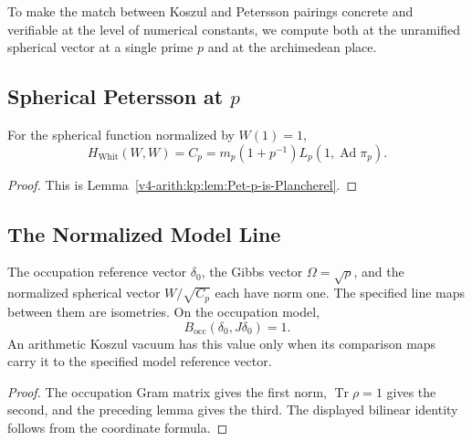 To make the match between Koszul and Petersson pairings
concrete and verifiable at the level of numerical constants,
we compute both at the unramified spherical vector at a
single prime \(p\) and at the archimedean place.

\subsection{Spherical Petersson at \texorpdfstring{\(p\)}{p}}
\label{v4-arith:kp:spherical-calc:Pet-p}

\begin{lemma}
\label{v4-arith:kp:lem:spherical-Pet-p}
For the spherical function normalized by \(W(1)=1\),
\begin{equation}
\label{v4-arith:kp:eq:spherical-Pet-p}
 H_{\mathrm{Whit}}(W,W)=C_p
 =m_p(1+p^{-1})L_p(1,\operatorname{Ad}\pi_p).
\end{equation}
\end{lemma}
\begin{proof}
This is Lemma~\ref{v4-arith:kp:lem:Pet-p-is-Plancherel}.
\end{proof}

\subsection{The Normalized Model Line}
\label{v4-arith:kp:spherical-calc:Koszul-p}
\begin{lemma}
\label{v4-arith:kp:lem:spherical-Koszul-p}
The occupation reference vector \(\delta_0\), the Gibbs vector
\(\Omega=\sqrt\rho\), and the normalized spherical vector
\(W/\sqrt{C_p}\) each have norm one. The specified line maps
between them are isometries. On the occupation model,
\begin{equation}
\label{v4-arith:kp:eq:spherical-Koszul-p}
 B_{\mathrm{occ}}(\delta_0,J\delta_0)=1.
\end{equation}
An arithmetic Koszul vacuum has this value only when its comparison
maps carry it to the specified model reference vector.
\end{lemma}
\begin{proof}
The occupation Gram matrix gives the first norm, \(\operatorname{Tr}\rho=1\)
gives the second, and the preceding lemma gives the third.
The displayed bilinear identity follows from the coordinate formula.
\end{proof}


